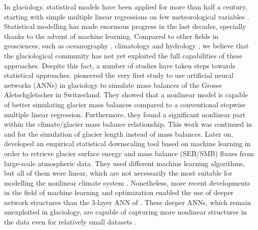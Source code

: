 In glaciology, statistical models have been applied for more than half a century, starting with simple multiple linear regressions on few meteorological variables \citep{hoinkes_glacier_1968, martin_correlation_1974}. Statistical modelling has made enormous progress in the last decades, specially thanks to the advent of machine learning. Compared to other fields in geosciences, such as oceanography \citep[e.g.,][]{ducournau_deep_2016, lguensat_eddynet:_2018}, climatology \citep[e.g.,][]{rasp_deep_2018, jiang_deep_2018} and hydrology \citep[e.g.,][]{marcais_prospective_2017, shen_transdisciplinary_2018}, we believe that the glaciological community has not yet exploited the full capabilities of these approaches. Despite this fact, a number of studies have taken steps towards statistical approaches. \citet{steiner_application_2005} pioneered the very first study to use artificial neural networks (ANNs) in glaciology to simulate mass balances of the Grosse Aletschgletscher in Switzerland. They showed that a nonlinear model is capable of better simulating glacier mass balances compared to a conventional stepwise multiple linear regression. Furthermore, they found a significant nonlinear part within the climate/glacier mass balance relationship. This work was continued in \citet{steiner_sensitivity_2008} and \citet{nussbaumer_reseau_2012} for the simulation of glacier length instead of mass balances. Later on, \citet{maussion_enso_2015} developed an empirical statistical downscaling tool based on machine learning in order to retrieve glacier surface energy and mass balance (SEB/SMB) fluxes from large-scale atmospheric data. They used different machine learning algorithms, but all of them were linear, which are not necessarily the most suitable for modelling the nonlinear climate system \citep{houghton_climate_2001}. Nonetheless, more recent developments in the field of machine learning and optimization enabled the use of deeper network structures than the 3-layer ANN of \citet{steiner_application_2005}. These deeper ANNs, which remain unexploited in glaciology, are capable of capturing more nonlinear structures in the data even for relatively small datasets  \citep{ingrassia_neural_2005, olson_modern_2018}. 

